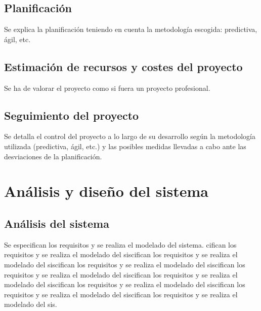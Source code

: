 \documentclass[pdftex,11pt,a4paper]{book}
\begin{document}
\section{Planificación}

Se explica la planificación teniendo en cuenta la metodología escogida: predictiva, ágil, etc.

\section{Estimación de recursos y costes del proyecto}

Se ha de valorar el proyecto como si fuera un proyecto profesional.

\section{Seguimiento del proyecto}

Se detalla el control del proyecto a lo largo de su desarrollo según la metodología utilizada (predictiva, ágil, etc.) y las posibles medidas llevadas a cabo ante las desviaciones de la planificación.

\chapter{Análisis y diseño del sistema}

\section{Análisis del sistema}

Se especifican los requisitos y se realiza el modelado del sistema. cifican los requisitos y se realiza el modelado del siscifican los requisitos y se realiza el modelado del siscifican los requisitos y se realiza el modelado del siscifican los requisitos y se realiza el modelado del siscifican los requisitos y se realiza el modelado del siscifican los requisitos y se realiza el modelado del siscifican los requisitos y se realiza el modelado del siscifican los requisitos y se realiza el modelado del sis.
\newpage


\renewcommand{\tablename}{Tabla}
\renewcommand{\arraystretch}{1,7}
\end{document}
